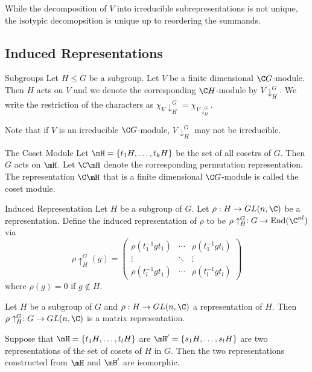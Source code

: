 \documentclass[a4paper]{article}
\begin{document}
While the decomposition of $V$ into irreducible subrepresentations is not unique, the isotypic decomopsition is unique up to reordering the summands. 

\subsection{Induced Representations}
\begin{defn}{Subgroups}{} Let $H\leq G$ be a subgroup. Let $V$ be a finite dimensional $\C G$-module. Then $H$ acts on $V$ and we denote the corresponding $\C H$-module by $V\downarrow_H^G$. We write the restriction of the characters as $\chi_V\downarrow_H^G=\chi_{V\downarrow_H^G}$. 
\end{defn}

Note that if $V$ is an irreducible $\C G$-module, $V\downarrow_H^G$ may not be irreducible. 

\begin{defn}{The Coset Module}{} Let $\mH=\{t_1H,\dots,t_kH\}$ be the set of all cosetrs of $G$. Then $G$ acts on $\mH$. Let $\C\mH$ denote the corresponding permutation representation. The representation $\C\mH$ that is a finite dimensional $\C G$-module is called the coset module. 
\end{defn}

\begin{defn}{Induced Representation}{} Let $H$ be a subgroup of $G$. Let $\rho:H\to GL(n,\C)$ be a representation. Define the induced representation of $\rho$ to be $\rho\uparrow_H^G:G\to\text{End}(\C^{nl})$ via $$\rho\uparrow_H^G(g)=\begin{pmatrix}
\rho(t_1^{-1}gt_1) & \cdots & \rho(t_1^{-1}gt_l)\\
\vdots & \ddots & \vdots\\
\rho(t_l^{-1}gt_1) & \cdots & \rho(t_l^{-1}gt_l)
\end{pmatrix}$$ where $\rho(g)=0$ if $g\notin H$. 
\end{defn}

\begin{thm}{}{} Let $H$ be a subgroup of $G$ and $\rho:H\to GL(n,\C)$ a representation of $H$. Then $\rho\uparrow_H^G:G\to GL(n,\C)$ is a matrix representation. 
\end{thm}

\begin{thm}{}{} Suppose that $\mH=\{t_1H,\dots,t_lH\}$ are $\mH'=\{s_1H,\dots,s_lH\}$ are two representations of the set of cosets of $H$ in $G$. Then the two representations constructed from $\mH$ and $\mH'$ are isomorphic. 
\end{thm}
\end{document}
